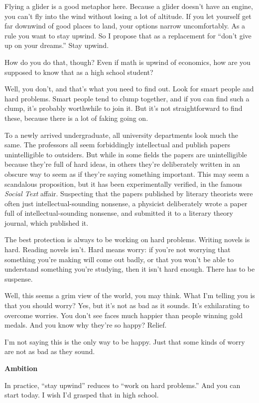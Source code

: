 Flying a glider is a good metaphor here. Because a glider doesn't have
an engine, you can't fly into the wind without losing a lot of altitude.
If you let yourself get far downwind of good places to land, your
options narrow uncomfortably. As a rule you want to stay upwind. So I
propose that as a replacement for ``don't give up on your dreams.'' Stay
upwind.

How do you do that, though? Even if math is upwind of economics, how are
you supposed to know that as a high school student?

Well, you don't, and that's what you need to find out. Look for smart
people and hard problems. Smart people tend to clump together, and if
you can find such a clump, it's probably worthwhile to join it. But it's
not straightforward to find these, because there is a lot of faking
going on.

To a newly arrived undergraduate, all university departments look much
the same. The professors all seem forbiddingly intellectual and publish
papers unintelligible to outsiders. But while in some fields the papers
are unintelligible because they're full of hard ideas, in others they're
deliberately written in an obscure way to seem as if they're saying
something important. This may seem a scandalous proposition, but it has
been experimentally verified, in the famous \emph{Social Text} affair.
Suspecting that the papers published by literary theorists were often
just intellectual-sounding nonsense, a physicist deliberately wrote a
paper full of intellectual-sounding nonsense, and submitted it to a
literary theory journal, which published it.

The best protection is always to be working on hard problems. Writing
novels is hard. Reading novels isn't. Hard means worry: if you're not
worrying that something you're making will come out badly, or that you
won't be able to understand something you're studying, then it isn't
hard enough. There has to be suspense.

Well, this seems a grim view of the world, you may think. What I'm
telling you is that you should worry? Yes, but it's not as bad as it
sounds. It's exhilarating to overcome worries. You don't see faces much
happier than people winning gold medals. And you know why they're so
happy? Relief.

I'm not saying this is the only way to be happy. Just that some kinds of
worry are not as bad as they sound.

\textbf{Ambition}

In practice, ``stay upwind'' reduces to ``work on hard problems.'' And
you can start today. I wish I'd grasped that in high school.

